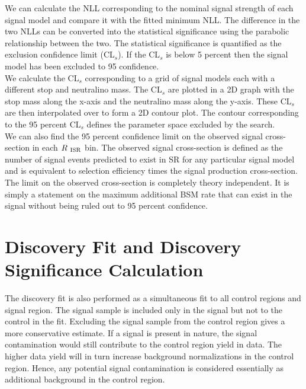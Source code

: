 \indent We can calculate the NLL corresponding to the nominal signal strength of each signal model and compare it with the fitted minimum NLL.  The difference in the two NLLs can be converted into the statistical significance using the parabolic relationship between the two.  The statistical significance is quantified as the exclusion confidence limit (CL$_s$).  If the CL$_s$ is below 5 percent then the signal model has been excluded to 95 confidence. \\

\indent We calculate the CL$_s$ corresponding to a grid of signal models each with a different stop and neutralino mass.  The CL$_s$ are plotted in a 2D graph with the stop mass along the x-axis and the neutralino mass along the y-axis.  These CL$_s$ are then interpolated over to form a 2D contour plot.  The contour corresponding to the 95 percent CL$_s$ defines the parameter space excluded by the search. \\

\indent We can also find the 95 percent confidence limit on the observed signal cross-section in each $R_{~\mathrm{ISR}}$ bin.  The observed signal cross-section is defined as the number of signal events predicted to exist in SR for any particular signal model and is equivalent to selection efficiency times the signal production cross-section.  The limit on the observed cross-section is completely theory independent.  It is simply a statement on the maximum additional BSM rate that can exist in the signal without being ruled out to 95 percent confidence.  \\

\section{Discovery Fit and Discovery Significance Calculation}
\label{sec:stat:discovery}

\indent The discovery fit is also performed as a simultaneous fit to all control regions and signal region.  The signal sample is included only in the signal but not to the control in the fit.  Excluding the signal sample from the control region gives a more conservative estimate.  If a signal is present in nature, the signal contamination would still contribute to the control region yield in data.  The higher data yield will in turn increase background normalizations in the control region.  Hence, any potential signal contamination is considered essentially as additional background in the control region. \\

